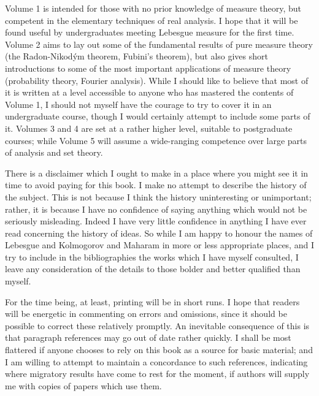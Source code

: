 \noindent Volume 1 is intended for those with no prior knowledge of
measure theory, but competent in the elementary techniques of real
analysis.  I hope that it will be found useful by undergraduates meeting
Lebesgue measure for the first time.    Volume 2 aims to lay out some of
the fundamental results of pure measure theory (the
Radon-Nikod\'ym theorem, Fubini's theorem), but also gives short
introductions to some of the most important applications of measure
theory (probability theory, Fourier analysis).   While I should like to
believe that most of it is written at a level accessible to anyone who
has mastered the contents of Volume 1, I should not myself have the
courage to try to cover it in an undergraduate course, though I would
certainly attempt to include some parts of it.   Volumes 3 and 4 are
set at a rather higher level, suitable to postgraduate courses;  while
Volume 5 will assume a wide-ranging competence over large parts of
analysis and set theory.

There is a disclaimer which I ought to make in a place where you might
see it in time to avoid paying for this book.   I make no attempt to
describe the history of the subject.   This is not because I think the
history uninteresting or unimportant;  rather, it is because I have no
confidence of saying anything which would not be seriously misleading.
Indeed I have very little confidence in anything I have ever read
concerning the history of ideas.   So while I am happy to honour the
names of Lebesgue and Kolmogorov and Maharam in more or less appropriate
places, and I try to include in the bibliographies the works which I
have myself consulted, I leave any consideration of the details to those
bolder and better qualified than myself.

For the time being, at
least, printing will be in short runs.   I hope that readers will be
energetic in commenting on errors and omissions, since it should be
possible to correct these relatively promptly.   An inevitable
consequence of this is that paragraph references may go out of date
rather quickly.   I shall be most flattered if anyone chooses to rely on
this book as a source for basic material;  and I am willing to attempt
to maintain a concordance to such references, indicating where migratory
results have come to rest for the moment, if authors will supply me with
copies of papers which use them.

